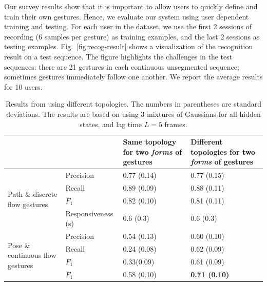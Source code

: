 \documentclass[conference]{IEEEtran}
\begin{document}
Our survey results show that it is
important to allow users to quickly define and train their own gestures. Hence,
we evaluate our system using user dependent training and testing. For each user
in the dataset, we use the first 2 sessions of recording (6 samples per gesture)
as training examples, and the last 2 sessions as testing examples.
Fig.~\ref{fig:recog-result} shows a visualization of the recognition result on a
test sequence. The figure highlights the challenges in the test sequences:
there are 21 gestures in each continuous unsegmented sequence; sometimes
gestures immediately follow one another. We report the average results for 10 users.

\begin{table}[t]
\caption{Results from using different topologies. The numbers in parentheses are
standard deviations. The results are based on using 3 mixtures of Gaussians
for all hidden states, and lag time
$L = 5$ frames.}
\label{tab:result}
\centering
\begin{tabular}{|l|l|p{1.8cm}|p{1.8cm}|}
\hline
& & Same topology for two \textit{forms} of gestures & Different
topologies for two \textit{forms} of gestures \\
\hline
\multirow{4}{2cm}{Path \& discrete flow gestures} 
& Precision & 0.77 (0.14) & 0.77 (0.15) \\
\cline{2-4}
& Recall & 0.89 (0.09) & 0.88 (0.11)\\
\cline{2-4}
& $F_1$ & 0.82 (0.10) &  0.81 (0.11)\\
\cline{2-4}
& Responsiveness (s) & 0.6 (0.3) & 0.6 (0.3) \\
\hline
\multirow{4}{2cm}{Pose \& continuous flow gestures}
& Precision & 0.54 (0.13) & 0.60 (0.10) \\
\cline{2-4}
& Recall & 0.24 (0.08) & 0.62 (0.09) \\
\cline{2-4}
& $F_1$ & 0.33(0.09) & 0.61 (0.09) \\
\hline
\textbf{Average} & $F_1$ & 0.58 (0.10) & \textbf{0.71 (0.10)} \\
\hline
\end{tabular}
\end{table}
\end{document}
